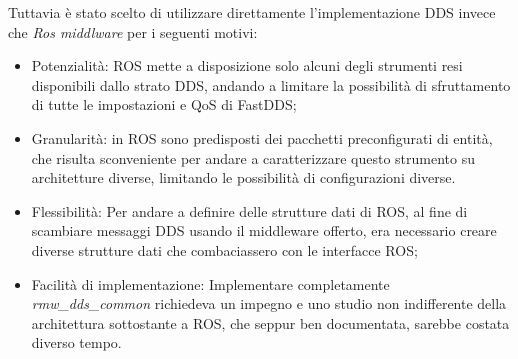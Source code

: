 Tuttavia è stato scelto di utilizzare direttamente l'implementazione DDS invece che \emph{Ros middlware} per i seguenti motivi:
\begin{itemize}
    \item Potenzialità: ROS mette a disposizione solo alcuni degli strumenti resi disponibili dallo strato DDS, andando a limitare la possibilità di sfruttamento di tutte le impostazioni e QoS di FastDDS;
    \item Granularità: in ROS sono predisposti dei pacchetti preconfigurati di entità, che risulta sconveniente per andare a caratterizzare questo strumento su architetture diverse, limitando le possibilità di configurazioni diverse.
    \item Flessibilità: Per andare a definire delle strutture dati di ROS, al fine di scambiare messaggi DDS usando il middleware offerto, era necessario creare diverse strutture dati che combaciassero con le interfacce ROS;
    \item Facilità di implementazione: Implementare completamente \emph{rmw\_dds\_common} richiedeva un impegno e uno studio non indifferente della architettura sottostante a ROS, che seppur ben documentata, sarebbe costata diverso tempo. 
\end{itemize}





